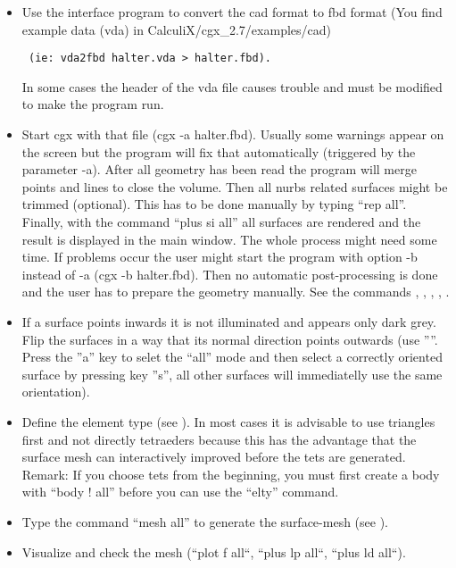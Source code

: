 \documentclass{article}
\begin{document}
\begin{appendix}
\begin{itemize}
\item Use the interface program to convert the cad format to fbd format (You find example data (vda) in CalculiX/cgx\_2.7/examples/cad)\begin{verbatim} (ie: vda2fbd halter.vda > halter.fbd). \end{verbatim} In some cases the header of the vda file causes trouble and must be modified to make the program run.

\item Start cgx with that file (cgx -a halter.fbd). Usually some warnings appear on the screen but the program will fix that automatically (triggered by the parameter -a). After all geometry has been read the program will merge points and lines to close the volume. Then all nurbs related surfaces might be trimmed (optional). This has to be done manually by typing ``rep all''. Finally, with the command ``plus si all'' all surfaces are rendered and the result is displayed in the main window. The whole process might need some time. If problems occur the user might start the program with option -b instead of -a (cgx -b halter.fbd). Then no automatic post-processing is done and the user has to prepare the geometry manually. See the commands , , , , .

\item If a surface points inwards it is not illuminated and appears only dark grey. Flip the surfaces in a way that its normal direction points outwards (use ''''. Press the ''a'' key to selet the ``all'' mode and then select a correctly oriented surface by pressing key ''s'', all other surfaces will immediatelly use the same orientation).

\item Define the element type (see ). In most cases it is advisable to use triangles first and not directly tetraeders because this has the advantage that the surface mesh can interactively improved before the tets are generated. Remark: If you choose tets from the beginning, you must first create a body with ``body ! all'' before you can use the ``elty'' command.

\item Type the command ``mesh all'' to generate the surface-mesh (see ).

\item Visualize and check the mesh (``plot f all``, ``plus lp all``, ``plus ld all``).


\end{itemize}
\end{appendix}
\end{document}
